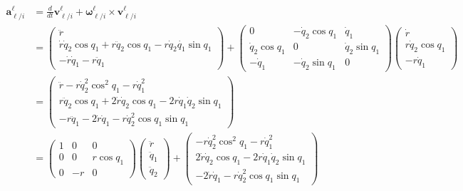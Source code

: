 \documentclass{article}
\newcommand{\abf}{\mathbf{a}}
\newcommand{\vbf}{\mathbf{v}}
\newcommand{\omegabf}{\boldsymbol{\omega}}
\begin{document}
\begin{align*}
	\abf_{\ell/i}^\ell &= \frac{d}{dt}\vbf_{\ell/i}^\ell + 	\omegabf_{\ell/i}^{\ell} \times \vbf_{\ell/i}^\ell \\
	&= \begin{pmatrix} 
			\ddot{r} \\ 
			\dot{r}\dot{q}_2  \cos q_1 + r\ddot{q}_2\cos q_1 - r\dot{q}_2\dot{q_1}\sin q_1 \\ 
			-\dot{r} \dot{q}_1 - r\ddot{q}_1 
		\end{pmatrix} 
		+ \begin{pmatrix}
			0 & -\dot{q}_2\cos q_1 & \dot{q}_1 \\
			\dot{q}_2\cos q_1 & 0 & \dot{q}_2\sin q_1 \\
			-\dot{q}_1 & -\dot{q}_2\sin q_1 & 0
	   	  \end{pmatrix} 
	   	  \begin{pmatrix}
	   	  		\dot{r} \\
 	    		r\dot{q}_2  \cos q_1 \\
 	    		-r \dot{q}_1 
 	      \end{pmatrix} \\
	&= \begin{pmatrix}
 	    \ddot{r} - r\dot{q}_2^2\cos^2 q_1 -r\dot{q}_1^2 \\
 	     r\ddot{q}_2\cos q_1 + 2\dot{r}\dot{q}_2  \cos q_1  - 2r\dot{q}_1\dot{q}_2\sin q_1 \\
 	    - r\ddot{q}_1 -2\dot{r} \dot{q}_1  - r\dot{q}_2^2\cos q_1 \sin q_1 
 	   \end{pmatrix} \\
 	&= \begin{pmatrix}
 	    1 & 0 & 0 \\
 	    0 & 0 & r\cos q_1 \\
 	    0 & -r & 0  
 	   \end{pmatrix} \begin{pmatrix} \ddot{r} \\ \ddot{q}_1 \\ \ddot{q}_2 \end{pmatrix} 
 	   + \begin{pmatrix}
 	    - r\dot{q}_2^2\cos^2 q_1 -r\dot{q}_1^2 \\
 	     2\dot{r}\dot{q}_2  \cos q_1  - 2r\dot{q}_1\dot{q}_2\sin q_1 \\
 	    -2\dot{r} \dot{q}_1  - r\dot{q}_2^2\cos q_1 \sin q_1 
 	   \end{pmatrix}
\end{align*}
\end{document}
